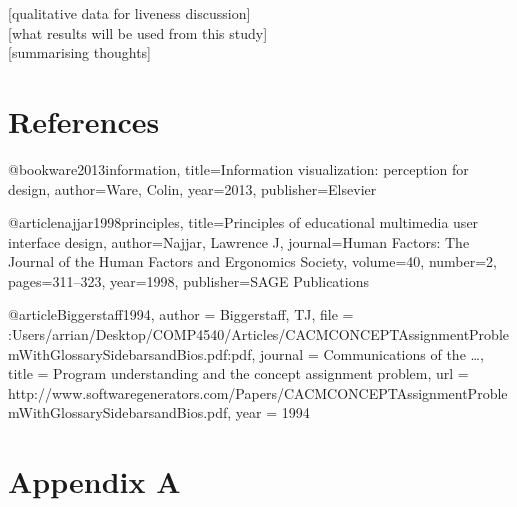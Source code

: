 \documentclass{article}
\begin{document}
[qualitative data for liveness discussion]\\

[what results will be used from this study]\\

[summarising thoughts]\\

\section{References}


@book{ware2013information,
  title={Information visualization: perception for design},
  author={Ware, Colin},
  year={2013},
  publisher={Elsevier}
}

@article{najjar1998principles,
  title={Principles of educational multimedia user interface design},
  author={Najjar, Lawrence J},
  journal={Human Factors: The Journal of the Human Factors and Ergonomics Society},
  volume={40},
  number={2},
  pages={311--323},
  year={1998},
  publisher={SAGE Publications}
}

@article{Biggerstaff1994,
author = {Biggerstaff, TJ},
file = {:Users/arrian/Desktop/COMP4540/Articles/CACMCONCEPTAssignmentProblemWithGlossarySidebarsandBios.pdf:pdf},
journal = {Communications of the \ldots},
title = {{Program understanding and the concept assignment problem}},
url = {http://www.softwaregenerators.com/Papers/CACMCONCEPTAssignmentProblemWithGlossarySidebarsandBios.pdf},
year = {1994}
}


\section{Appendix A}
\end{document}
